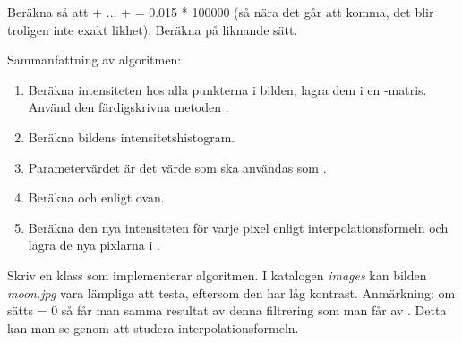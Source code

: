 Beräkna  så att  + ... +  = 0.015 * 100000 (så nära det går att komma, det blir troligen inte exakt likhet). Beräkna  på liknande sätt.

Sammanfattning av algoritmen:
\begin{enumerate}
	\item Beräkna intensiteten hos alla punkterna i bilden, lagra dem i en -matris. Använd den färdigskrivna metoden .
	\item Beräkna bildens intensitetshistogram.
	\item Parametervärdet  är det värde som ska användas som .
	\item Beräkna  och  enligt ovan.
	\item Beräkna den nya intensiteten för varje pixel enligt interpolationsformeln och lagra de nya pixlarna i .
\end{enumerate}
Skriv en klass  som implementerar algoritmen. I katalogen \emph{images} kan bilden \emph{moon.jpg} vara lämpliga att testa, eftersom den har låg kontrast. Anmärkning: om  sätts = 0 så får man samma resultat av denna filtrering som man får av . Detta kan man se genom att studera interpolationsformeln.
